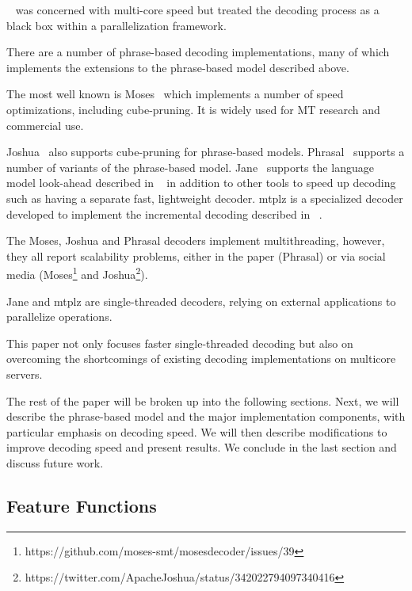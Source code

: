 \documentclass[11pt]{article}
\begin{document}
~ was concerned with multi-core speed but treated the decoding process as a black box within a parallelization framework.

There are a number of phrase-based decoding implementations, many of which implements the extensions to the phrase-based model described above.

The most well known is Moses~\cite{koehn-EtAl:2007:PosterDemo} which implements a number of speed optimizations, including cube-pruning. It is widely used for MT research and commercial use. 

Joshua~\cite{Joshua-Decoder} also supports cube-pruning for phrase-based models. Phrasal~\cite{spence2014phrasal} supports a number of variants of the phrase-based model. Jane~\cite{peitz2012jane} supports the language model look-ahead described in ~ in addition to other tools to speed up decoding such as having a separate fast, lightweight decoder. mtplz is a specialized decoder developed to implement the incremental decoding described in ~.

The Moses, Joshua and Phrasal decoders implement multithreading, however, they all report scalability problems, either in the paper (Phrasal) or via social media (Moses\footnote{\scriptsize https://github.com/moses-smt/mosesdecoder/issues/39} and Joshua\footnote{\scriptsize https://twitter.com/ApacheJoshua/status/342022794097340416}).

Jane and mtplz are single-threaded decoders, relying on external applications to parallelize operations. %

This paper not only focuses faster single-threaded decoding but also on overcoming the shortcomings of existing decoding implementations on multicore servers.

The rest of the paper will be broken up into the following sections. Next, we will describe the phrase-based model and the major implementation components, with particular emphasis on decoding speed. We will then describe modifications to improve decoding speed and present results. We conclude in the last section and discuss future work.

\subsection{Feature Functions}
\end{document}

